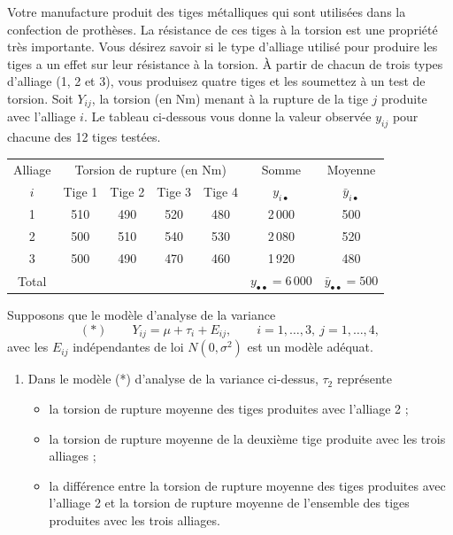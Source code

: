 \begin{exercice}
Votre manufacture produit des tiges métalliques qui sont utilisées dans la confection de
prothèses. La résistance de ces tiges à la torsion est une propriété très importante. Vous
désirez savoir si le type d'alliage utilisé pour produire les tiges a un effet sur leur
résistance à la torsion. À partir de chacun de trois types d'alliage (1, 2 et 3), vous
produisez quatre tiges et les soumettez à un test de torsion. Soit $Y_{ij}$, la torsion (en
Nm) menant à la rupture de la tige $j$ produite avec l'alliage $i$. Le tableau ci-dessous
vous donne la valeur observée $y_{ij}$ pour chacune des 12 tiges testées.
\begin{center}
\begin{tabular}{c*{4}{c}cc}
  \toprule
  Alliage & \multicolumn{4}{c}{Torsion de rupture (en Nm)} & Somme & Moyenne\\
  $i$ & Tige 1 & Tige 2 & Tige 3 & Tige 4 & $y_{i\bullet}$ & $\bar y_{i\bullet}$\\
  \midrule
  1 & 510 & 490 & 520 & 480 & 2\,000 & 500\\
  2 & 500 & 510 & 540 & 530 & 2\,080 & 520\\
  3 & 500 & 490 & 470 & 460 & 1\,920 & 480\\
  \midrule
  Total & & & & & $y_{\bullet\bullet}=6\,000$ & $\bar y_{\bullet\bullet}=500$\\
  \bottomrule
\end{tabular}
\end{center}
Supposons que le modèle d'analyse de la variance
\[
  (*)\qquad Y_{ij}=\mu+\tau_i+E_{ij},\qquad i=1,\dots,3,\ j=1,\dots,4,
\]
avec les $E_{ij}$ indépendantes de loi $N(0,\sigma^2)$ est un modèle adéquat.
\begin{enumerate}[label=(\alph*)]
  \item Dans le modèle (*) d'analyse de la variance ci-dessus, $\tau_2$ représente
  \begin{itemize}
    \item[$\square$] la torsion de rupture moyenne des tiges produites avec l'alliage 2 ;
    \item[$\square$] la torsion de rupture moyenne de la deuxième tige produite avec les
    trois alliages ;
    \item[$\square$] la différence entre la torsion de rupture moyenne des tiges produites
    avec l'alliage 2 et la torsion de rupture moyenne de l'ensemble des tiges produites avec
    les trois alliages.
  \end{itemize}

\end{enumerate}
\end{exercice}
